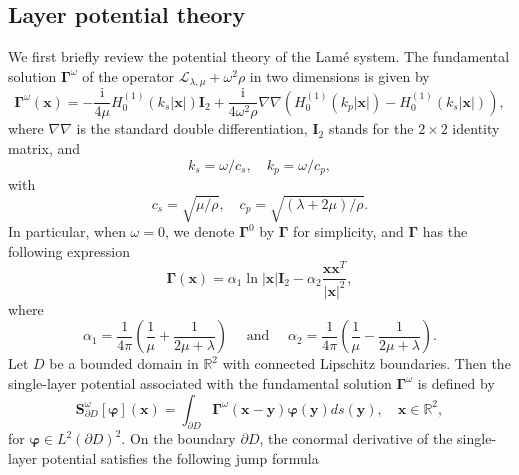 \documentclass[10pt,reqno,oneside]{amsart}%
\theoremstyle{definition}
\theoremstyle{remark}
\numberwithin{equation}{section}
\numberwithin{equation}{section}
\begin{document}
\subsection{Layer potential theory}
We first briefly review the potential theory of the Lam\'e system. The fundamental solution $\boldsymbol{\Gamma}^{\omega}$ of the operator $\mathcal{L}_{\lambda, \mu}+\omega^{2}\rho$ in two dimensions is given by \cite{HAmmariElasticityImaging}
\begin{equation}\label{fundamental solution}
\boldsymbol{\Gamma}^{\omega}(\mathbf{x})=-\frac{\mathrm{i}}{4\mu}H_0^{(1)}\left(k_s|\mathbf{x}|\right)\mathbf{I}_2+\frac{\mathrm{i}}{4\omega^2\rho}\nabla\nabla\left(H_0^{(1)}\left(k_p|\mathbf{x}|\right)-H_0^{(1)}\left(k_s|\mathbf{x}|\right)\right),
\end{equation}
where $\nabla\nabla$ is the standard double differentiation, $\mathbf{I}_2$ stands for the $2\times2$ identity matrix, and
\begin{equation}\label{kskp}
k_{s}=\omega / c_{s}, \quad k_{p}=\omega / c_{p},
\end{equation}
with
\begin{equation}\label{cscp}
c_{s}=\sqrt{\mu / \rho}, \quad c_{p}=\sqrt{(\lambda+2 \mu) / \rho} .
\end{equation}
In particular, when $\omega=0$, we denote $\boldsymbol{\Gamma}^{0}$ by $\boldsymbol{\Gamma}$ for simplicity, and $\boldsymbol{\Gamma}$ has the following expression
\begin{equation}\label{gamma}
\boldsymbol{\Gamma}(\mathbf{x})=\alpha_1\ln|\mathbf{x}|\mathbf{I}_2-\alpha_2\frac{\mathbf{x}\mathbf{x}^T}{|\mathbf{x}|^2},
\end{equation}
where
\begin{equation}\label{alpha12}
\alpha_1=\frac{1}{4\pi}\left(\frac{1}{\mu}+\frac{1}{2 \mu+\lambda}\right) \quad \text { and } \quad \alpha_2=\frac{1}{4\pi}\left(\frac{1}{\mu}-\frac{1}{2 \mu+\lambda}\right) .
\end{equation}
Let $D$ be a bounded domain in $\mathbb{R}^{2}$ with connected Lipschitz boundaries. Then the single-layer potential associated with the fundamental solution $\boldsymbol{\Gamma}^{\omega}$ is defined by
\begin{equation}
\mathbf{S}_{\partial D}^{\omega}[\boldsymbol{\varphi}](\mathbf{x})=\int_{\partial D} \boldsymbol{\Gamma}^{\omega}(\mathbf{x}-\mathbf{y}) \boldsymbol{\varphi}(\mathbf{y}) d s(\mathbf{y}), \quad \mathbf{x} \in \mathbb{R}^{2},
\end{equation}
for $\boldsymbol{\varphi} \in L^{2}(\partial D)^{2}$. On the boundary $\partial D$, the conormal derivative of the single-layer potential satisfies the following jump formula
\end{document}

